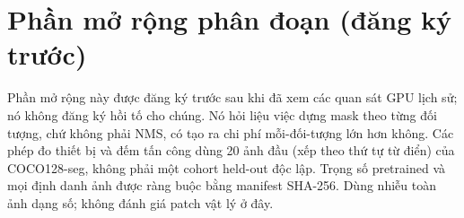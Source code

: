 \section{Phần mở rộng phân đoạn (đăng ký trước)}
\label{app:segmentation}
Phần mở rộng này được đăng ký trước sau khi đã xem các quan sát GPU lịch sử; nó không đăng ký hồi tố cho chúng. Nó hỏi liệu việc dựng mask theo từng đối tượng, chứ không phải NMS, có tạo ra chi phí mỗi-đối-tượng lớn hơn không. Các phép đo thiết bị và đếm tấn công dùng 20 ảnh đầu (xếp theo thứ tự từ điển) của COCO128-seg, không phải một cohort held-out độc lập. Trọng số pretrained và mọi định danh ảnh được ràng buộc bằng manifest SHA-256. Dùng nhiễu toàn ảnh dạng số; không đánh giá patch vật lý ở đây.

